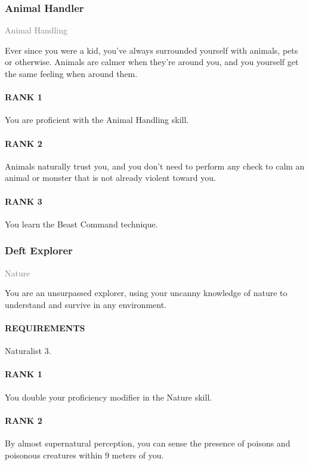 \subsubsection{Animal Handler} \label{feat::animalhandler}
\small{\textcolor{gray}{Animal Handling}}

\normalsize
Ever since you were a kid, you've always surrounded yourself with animals, pets or otherwise.
Animals are calmer when they're around you, and you yourself get the same feeling when around them.
\paragraph{RANK 1} You are proficient with the Animal Handling skill.
\paragraph{RANK 2} Animals naturally trust you, and you don't need to perform any check to calm an animal or monster that is not already violent toward you.
\paragraph{RANK 3} You learn the Beast Command technique.

\subsubsection{Deft Explorer} \label{feat::deftexplorer}
\small{\textcolor{gray}{Nature}}

\normalsize
You are an unsurpassed explorer, using your uncanny knowledge of nature to understand and survive in any environment.
\paragraph{REQUIREMENTS} Naturalist 3.
\paragraph{RANK 1} You double your proficiency modifier in the Nature skill.
\paragraph{RANK 2} By almost supernatural perception, you can sense the presence of poisons and poisonous creatures within 9 meters of you.
